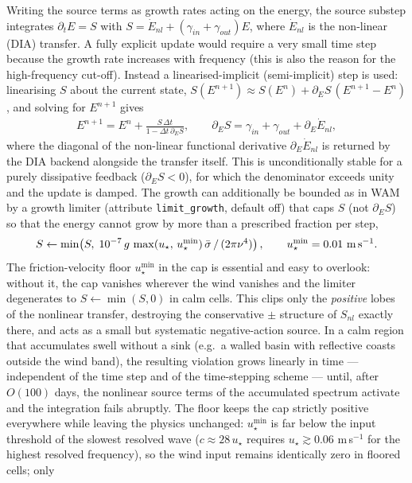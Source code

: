 \documentclass[12pt]{article}
\newcommand{\beq}  { \begin{eqnarray} }
\newcommand{\eeq}  { \end{eqnarray}}
\begin{document}
Writing the source terms as growth rates acting on the energy, the source substep
integrates $\partial_t E = S$ with $S = \dot E_{nl} + (\gamma_{in} +
\gamma_{out})E$, where $\dot E_{nl}$ is the non-linear (DIA) transfer. A fully
explicit update would require a very small time step because the growth rate
increases with frequency (this is also the reason for the high-frequency
cut-off). Instead a linearised-implicit (semi-implicit) step is used: linearising
$S$ about the current state, $S(E^{n+1}) \approx S(E^n) + \partial_E S\,
(E^{n+1}-E^n)$, and solving for $E^{n+1}$ gives
\beq \label{eq:implicit_source}
E^{n+1} = E^{n} + \frac{S\, \Delta t}{1 - \Delta t\, \partial_E S},
\qquad
\partial_E S = \gamma_{in} + \gamma_{out} + \partial_E \dot E_{nl},
\eeq
where the diagonal of the non-linear functional derivative
$\partial_E \dot E_{nl}$ is returned by the DIA backend alongside the transfer
itself. This is unconditionally stable for a purely dissipative feedback
($\partial_E S < 0$), for which the denominator exceeds unity and the update is
damped. The growth can additionally be bounded as in WAM by a growth limiter
(attribute \verb|limit_growth|, default off) that caps $S$ (not $\partial_E S$)
so that the energy cannot grow by more than a prescribed fraction per step,
\beq \label{eq:growthlimit}
S \leftarrow \min\!\left(S,\; 10^{-7}\, g\,
\max(u_\star,\,u_\star^{\min})\, \bar\sigma\,/\,(2\pi \nu^4)\right),
\qquad u_\star^{\min} = 0.01\ {\rm m\,s^{-1}}.
\eeq
The friction-velocity floor $u_\star^{\min}$ in the cap is essential and easy
to overlook: without it, the cap vanishes wherever the wind vanishes and the
limiter degenerates to $S \leftarrow \min(S,0)$ in calm cells. This clips only
the \emph{positive} lobes of the nonlinear transfer, destroying the
conservative $\pm$ structure of $S_{nl}$ exactly there, and acts as a small
but systematic negative-action source. In a calm region that accumulates swell
without a sink (e.g.\ a walled basin with reflective coasts outside the wind
band), the resulting violation grows linearly in time --- independent of the
time step and of the time-stepping scheme --- until, after $O(100)$ days, the
nonlinear source terms of the accumulated spectrum activate and the
integration fails abruptly. The floor keeps the cap strictly positive
everywhere while leaving the physics unchanged: $u_\star^{\min}$ is far below
the input threshold of the slowest resolved wave ($c \approx 28\,u_\star$
requires $u_\star \gtrsim 0.06$ m\,s$^{-1}$ for the highest resolved
frequency), so the wind input remains identically zero in floored cells; only
\end{document}
